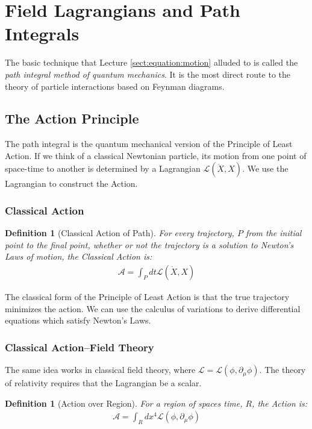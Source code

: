 \documentclass[]{article}
\newtheorem{defn}[thm]{Definition}
\begin{document}
\section{Field Lagrangians and Path Integrals}

The basic technique that Lecture \ref{sect:equation:motion} alluded to is called the \emph{path integral method of quantum mechanics}. It is the most direct route to the theory of particle interactions based on Feynman diagrams. 

\subsection{The Action Principle}

The path integral is the quantum mechanical version of the Principle of Least Action\cite{susskind2013quantum}. If we think of a classical Newtonian particle, its motion from one point of space-time to another is determined by a Lagrangian $\mathcal{L}(\dot{X},X)$. We use the Lagrangian to construct the Action. 

\subsubsection{Classical Action}

\begin{defn}[Classical Action of Path]
	For every trajectory, $P$ from the initial point to the final point, whether or not the trajectory is a solution to Newton's Laws of motion,  the Classical Action is: 
	\begin{align*}
		\mathcal{A}=\int_P dt \mathcal{L}(\dot{X},X)
	\end{align*}
\end{defn}


The classical form of the Principle of Least Action is that the true trajectory minimizes the action. We can use the calculus of variations to derive differential equations which satisfy Newton's Laws.

\subsubsection{Classical Action--Field Theory}

The same idea works in classical field theory, where $\mathcal{L}=\mathcal{L}(\phi,\partial_\mu\phi)$. The theory of relativity requires that the Lagrangian be a scalar\cite{susskind2017special}.

\begin{defn}[Action over Region]
	For a region of spaces time, $R$,  the Action is: 
	\begin{align*}
		\mathcal{A}=\int_R dx^4 \mathcal{L}(\phi,\partial_\mu\phi)
	\end{align*}
\end{defn}
\end{document}
